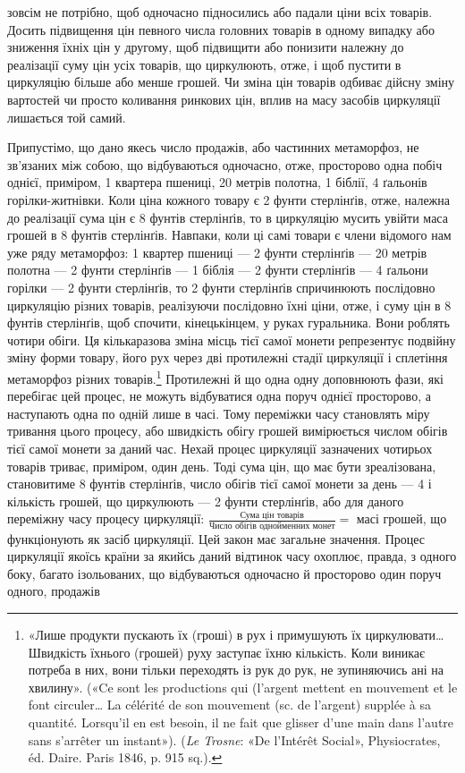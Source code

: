 \parcont{}  %
зовсім не потрібно, щоб одночасно підносились або падали ціни
всіх товарів. Досить підвищення цін певного числа головних
товарів в одному випадку або зниження їхніх цін у другому,
щоб підвищити або понизити належну до реалізації суму цін
усіх товарів, що циркулюють, отже, і щоб пустити в циркуляцію
більше або менше грошей. Чи зміна цін товарів одбиває дійсну
зміну вартостей чи просто коливання ринкових цін, вплив на
масу засобів циркуляції лишається той самий.

Припустімо, що дано якесь число продажів, або частинних
метаморфоз, не зв’язаних між собою, що відбуваються одночасно,
отже, просторово одна побіч однієї, приміром, 1 квартера пшениці,
20 метрів полотна, 1 біблії, 4 ґальонів горілки-житнівки. Коли
ціна кожного товару є 2 фунти стерлінґів, отже, належна до реалізації
сума цін є 8 фунтів стерлінґів, то в циркуляцію мусить
увійти маса грошей в 8 фунтів стерлінґів. Навпаки, коли ці самі
товари є члени відомого нам уже ряду метаморфоз: 1 квартер
пшениці — 2 фунти стерлінґів — 20 метрів полотна — 2 фунти
стерлінґів — 1 біблія — 2 фунти стерлінґів — 4 ґальони горілки —
2 фунти стерлінґів, то 2 фунти стерлінґів спричинюють послідовно
циркуляцію різних товарів, реалізуючи послідовно їхні
ціни, отже, і суму цін в 8 фунтів стерлінґів, щоб спочити, кінецькінцем,
у руках гуральника. Вони роблять чотири обіги. Ця
кількаразова зміна місць тієї самої монети репрезентує подвійну
зміну форми товару, його рух через дві протилежні стадії циркуляції
і сплетіння метаморфоз різних товарів.\footnote{
«Лише продукти пускають їх (гроші) в рух і примушують їх
циркулювати\dots{} Швидкість їхнього (грошей) руху заступає їхню кількість.
Коли виникає потреба в них, вони тільки переходять із рук до рук, не
зупиняючись ані на хвилину». («Ce sont les productions qui (l’argent
mettent en mouvement et le font circuler\dots{} La célérité de son mouvement
(sc. de l’argent) supplée à sa quantité. Lorsqu’il en est besoin, il ne fait
que glisser d’une main dans l’autre sans s’arrêter un instant»). (\emph{Le Trosne}:
«De l’Intérêt Social», Physiocrates, éd. Daire. Paris 1846, p. 915 sq.).
} Протилежні й
що одна одну доповнюють фази, які перебігає цей процес, не можуть
відбуватися одна поруч однієї просторово, а наступають
одна по одній лише в часі. Тому переміжки часу становлять міру
тривання цього процесу, або швидкість обігу грошей вимірюється
числом обігів тієї самої монети за даний час. Нехай процес
циркуляції зазначених чотирьох товарів триває, приміром, один
день. Тоді сума цін, що має бути зреалізована, становитиме
8 фунтів стерлінґів, число обігів тієї самої монети за день — 4
і кількість грошей, що циркулюють — 2 фунти стерлінґів, або
для даного переміжну часу процесу циркуляції:
$\frac{\text{Сума цін товарів}}{\text{Число обігів однойменних монет}} =$
масі грошей, що функціонують
як засіб циркуляції. Цей закон має загальне значення.
Процес циркуляції якоїсь країни за якийсь даний відтинок часу
охоплює, правда, з одного боку, багато ізольованих, що відбуваються
одночасно й просторово один поруч одного, продажів
\parbreak{}  %

